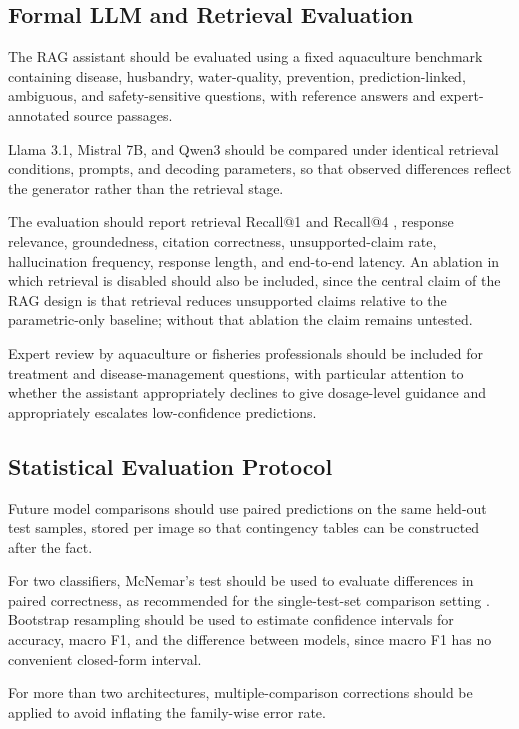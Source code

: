 \documentclass[conference]{IEEEtran}
\begin{document}
\subsection{Formal LLM and Retrieval Evaluation}

The RAG assistant \cite{b4} should be evaluated using a fixed aquaculture benchmark containing disease, husbandry, water-quality, prevention, prediction-linked, ambiguous, and safety-sensitive questions, with reference answers and expert-annotated source passages.

Llama 3.1, Mistral 7B, and Qwen3 should be compared under identical retrieval conditions, prompts, and decoding parameters, so that observed differences reflect the generator rather than the retrieval stage.

The evaluation should report retrieval Recall@1 and Recall@4 \cite{b6}, response relevance, groundedness, citation correctness, unsupported-claim rate, hallucination frequency, response length, and end-to-end latency. An ablation in which retrieval is disabled should also be included, since the central claim of the RAG design is that retrieval reduces unsupported claims relative to the parametric-only baseline; without that ablation the claim remains untested.

Expert review by aquaculture or fisheries professionals should be included for treatment and disease-management questions, with particular attention to whether the assistant appropriately declines to give dosage-level guidance and appropriately escalates low-confidence predictions.

\subsection{Statistical Evaluation Protocol}

Future model comparisons should use paired predictions on the same held-out test samples, stored per image so that contingency tables can be constructed after the fact.

For two classifiers, McNemar's test \cite{b16} should be used to evaluate differences in paired correctness, as recommended for the single-test-set comparison setting \cite{b18}. Bootstrap resampling \cite{b19} should be used to estimate confidence intervals for accuracy, macro F1, and the difference between models, since macro F1 has no convenient closed-form interval.

For more than two architectures, multiple-comparison corrections should be applied to avoid inflating the family-wise error rate.
\end{document}

